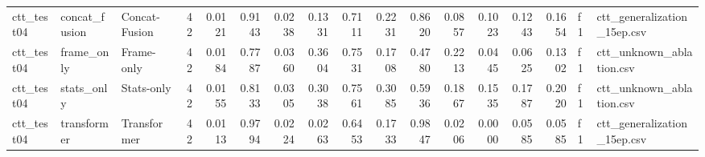 \begin{tabular}{lllrrrrrrrrrrrrll}
ctt\_test04 & concat\_fusion & Concat-Fusion & 42 & 0.0121 & 0.9143 & 0.0238 & 0.1331 & 0.7111 & 0.2231 & 0.8620 & 0.0857 & 0.1023 & 0.1243 & 0.1654 & f1 & ctt\_generalization\_15ep.csv \\
ctt\_test04 & frame\_only & Frame-only & 42 & 0.0184 & 0.7787 & 0.0360 & 0.3604 & 0.7531 & 0.1708 & 0.4780 & 0.2213 & 0.0445 & 0.0625 & 0.1302 & f1 & ctt\_unknown\_ablation.csv \\
ctt\_test04 & stats\_only & Stats-only & 42 & 0.0155 & 0.8133 & 0.0305 & 0.3038 & 0.7561 & 0.3085 & 0.5936 & 0.1867 & 0.1535 & 0.1787 & 0.2020 & f1 & ctt\_unknown\_ablation.csv \\
ctt\_test04 & transformer & Transformer & 42 & 0.0113 & 0.9794 & 0.0224 & 0.0263 & 0.6453 & 0.1733 & 0.9847 & 0.0206 & 0.0000 & 0.0585 & 0.0585 & f1 & ctt\_generalization\_15ep.csv \\
\bottomrule
\end{tabular}
